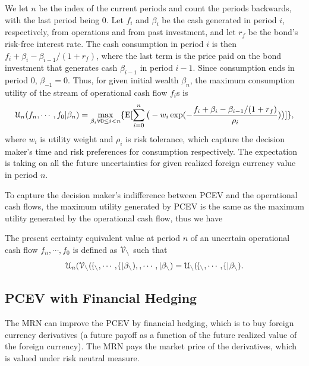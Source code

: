 \documentclass[mnsc,nonblindrev,copyedit]{informs2_wz} %
\newcommand{\E}{\mathrm{E}}
\newcommand{\V}{\cal{V}}
\begin{document}
We let $n$ be the index of the current periods and count the periods backwards, with the last period being 0. Let $f_i$ and $\beta_i$ be the cash generated in period $i$, respectively, from operations and from past investment, and let $r_f$ be the bond's risk-free interest rate. The cash consumption in period $i$ is then  $f_i + \beta_{i} -\beta_{i-1}/(1+r_f)$, where the last term is the price paid on the bond investment that generates cash $\beta_{i-1}$ in period $i-1$. Since consumption ends in period $0$, $\beta_{-1} =0$. Thus, for given initial wealth $\beta_{n}$,  the maximum consumption utility of the stream of operational cash flow $f_i$s is
\begin{eqnarray} 
     \label{eqn:bondInv-rho}
\mathcal{U}_n(f_n, \cdots, f_0|\beta_{n}) = \max_{\beta_{i} \forall 0 \leq i < n} \{\E [ \sum_{i=0}^n \big{(}-w_i \exp (-\frac{f_i + \beta_{i} -\beta_{i-1}/(1+r_f)}{\rho_i})\big{)}]\},
\end{eqnarray}
where $w_i$ is utility weight and $\rho_i$ is risk tolerance, which capture the decision maker's time and risk preferences for consumption respectively.  The expectation is taking on all the future uncertainties for given realized foreign currency value in period $n$.

To capture the decision maker's indifference between PCEV and the operational cash flows, the maximum utility generated by PCEV is the same as the maximum utility generated by the operational cash flow, thus we have

\begin{definition}
    \label{def:PCEV}
The present certainty equivalent value at period $n$ of an uncertain operational cash flow $f_n, \cdots, f_0$ is defined as $\V_n$ such that
\begin{eqnarray} 
     \label{eqn:PCEV}
\mathcal{U}_n(\V_n(f_n, \cdots, f_0|\beta_{n}), 0, \cdots, 0|\beta_{n}) = \mathcal{U}_n(f_n, \cdots, f_0|\beta_{n}).
\end{eqnarray}
\end{definition}





\subsection{PCEV with Financial Hedging}

The MRN can improve the PCEV by financial hedging, which is to buy foreign currency derivatives (a future payoff as a function of the future realized value of the foreign currency). The MRN pays the market price of the derivatives, which is valued under risk neutral measure.
\end{document}

